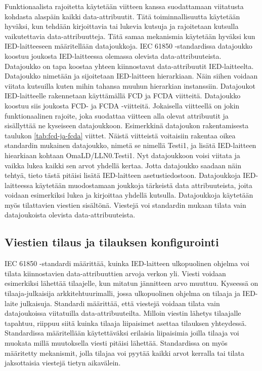 Funktionaalista rajoitetta käytetään viitteen kanssa suodattamaan viitatusta kohdasta alaspäin kaikki data-attribuutit. Tätä toiminnallisuutta käytetään hyväksi, kun tehdään kirjoittavia tai lukevia kutsuja ja rajoitetaan kutsulla vaikutettavia data-attribuutteja. Tätä samaa mekanismia käytetään hyväksi kun IED-laitteeseen määritellään datajoukkoja. IEC 61850 -standardissa datajoukko koostuu joukosta IED-laitteessa olemassa olevista data-attribuuteista. Datajoukko on tapa koostaa yhteen kiinnostavat data-attribuutit IED-laitteelta. Datajoukko nimetään ja sijoitetaan IED-laitteen hierarkiaan. Näin siihen voidaan viitata kutsuilla kuten mihin tahansa muuhun hierarkian instanssiin. Datajoukot IED-laitteelle rakennetaan käyttämällä FCD ja FCDA viitteitä. Datajoukko koostuu siis joukosta FCD- ja FCDA -viitteitä. Jokaisella viitteellä on jokin funktionaalinen rajoite, joka suodattaa viitteen alla olevat attribuutit ja sisällyttää ne kyseiseen datajoukkoon. Esimerkkinä datajoukon rakentamisesta taulukon \ref{tab:fcd-ja-fcda} viittet. Näistä viitteistä voitaisiin rakentaa oikea standardin mukainen datajoukko, nimetä se nimellä Testi1, ja lisätä IED-laitteen hiearkiaan kohtaan OmaLD/LLN0.Testi1. Nyt datajoukkoon voisi viitata ja vaikka lukea kaikki sen arvot yhdellä kertaa. Jotta datajoukko saadaan näin tehtyä, tieto tästä pitäisi lisätä IED-laitteen asetustiedostoon. Datajoukkoja IED-laitteessa käytetään muodostamaan joukkoja tärkeistä data attribuuteista, joita voidaan esimerkiksi lukea ja kirjoittaa yhdellä kutsulla. Datajoukkoja käytetään myös tilattavien viestien sisältönä. Viestejä voi standardin mukaan tilata vain datajoukoista olevista data-attribuuteista. \cite[s.~61--68]{IEC61850-7-2}


\subsection{Viestien tilaus ja tilauksen konfigurointi}
\label{ch:viestien-tilaus-ja-tilauksen-konfigurointi}
IEC 61850 -standardi määrittää, kuinka IED-laitteen ulkopuolinen ohjelma voi tilata kiinnostavien data-attribuuttien arvoja verkon yli. Viesti voidaan esimerkiksi lähettää tilaajelle, kun mitatun jännitteen arvo muuttuu. Kyseessä on tilaaja-julkaisija arkkitehtuurimalli, jossa ulkopuolinen ohjelma on tilaaja ja IED-laite julkaisuja. Standardi määrittää, että viestejä voidaan tilata vain datajoukoissa viitatuilla data-attribuuteilta. Milloin viestin lähetys tilaajalle tapahtuu, riippuu siitä kuinka tilaaja liipaisimet asettaa tilauksen yhteydessä. Standardissa määritellään käytettäväksi erilaisia liipaisimia joilla tilaaja voi muokata millä muutoksella viesti pitäisi lähettää. Standardissa on myös määritetty mekanismit, jolla tilajaa voi pyytää kaikki arvot kerralla tai tilata jaksottaisia viestejä tietyn aikavälein.

